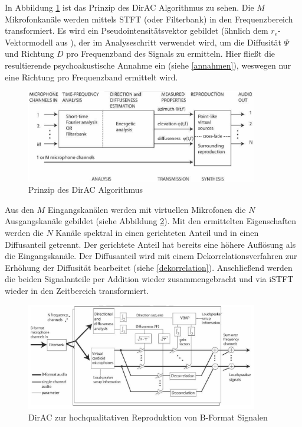 In Abbildung \ref{fig:dirac_flow_general} ist das Prinzip des DirAC Algorithmus zu sehen. Die $M$ Mikrofonkanäle werden mittels STFT (oder Filterbank) in den Frequenzbereich transformiert. Es wird ein Pseudointensitätsvektor gebildet (ähnlich dem $r_e$-Vektormodell aus \cite{ambi-book}), der im Analyseschritt verwendet wird, um die Diffusität $\Psi$ und Richtung $D$ pro Frequenzband des Signals zu ermitteln. Hier fließt die resultierende psychoakustische Annahme ein (siehe \ref{annahmen}), weswegen nur eine Richtung pro Frequenzband ermittelt wird.

\begin{figure}[!ht]
  \centering
  \includegraphics[width=0.9\textwidth]{funktionsweise/pic/pulkki_dirac_flow.png}
  \caption{Prinzip des DirAC Algorithmus\protect\footnotemark}
  \label{fig:dirac_flow_general}
\end{figure}


Aus den $M$ Eingangskanälen werden mit virtuellen Mikrofonen die $N$ Ausgangskanäle gebildet (siehe Abbildung \ref{fig:dirac_flow_high}). Mit den ermittelten Eigenschaften werden die $N$ Kanäle spektral in einen gerichteten Anteil und in einen Diffusanteil getrennt. Der gerichtete Anteil hat bereits eine höhere Auflösung als die Eingangskanäle. Der Diffusanteil wird mit einem Dekorrelationsverfahren zur Erhöhung der Diffusität bearbeitet (siehe \ref{dekorrelation}). Anschließend werden die beiden Signalanteile per Addition wieder zusammengebracht und via iSTFT wieder in den Zeitbereich transformiert.

\begin{figure}[!ht]
  \centering
  \includegraphics[width=0.9\textwidth]{funktionsweise/pic/pulkki_dirac_flow_2.png}
  \caption{DirAC zur hochqualitativen Reproduktion von B-Format Signalen\protect\footnotemark}
  \label{fig:dirac_flow_high}
\end{figure}

